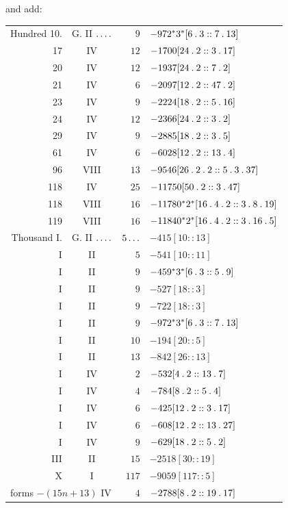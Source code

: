 \par{}and add:
\begin{longtable}{rcrl}
Hundred 10. & G. II $\mathinner{.\,.\,.\,.}$ & $9$ & $-972{}^{*}3^{*}[6\mathbin{.}3::7\mathbin{.}13]$ \\
17 & IV & $12$ & $-1700[24\mathbin{.}2::3\mathbin{.}17]$ \\
20 & IV & $12$ & $-1937[24\mathbin{.}2::7\mathbin{.}2]$ \\
21 & IV & $6$ & $-2097[12\mathbin{.}2::47\mathbin{.}2]$ \\
23 & IV & $9$ & $-2224[18\mathbin{.}2::5\mathbin{.}16]$ \\
24 & IV & $12$ & $-2366[24\mathbin{.}2::3\mathbin{.}2]$ \\
29 & IV & $9$ & $-2885[18\mathbin{.}2::3\mathbin{.}5]$ \\
61 & IV & $6$ & $-6028[12\mathbin{.}2::13\mathbin{.}4]$ \\
96 & VIII & $13$ & $-9546[26\mathbin{.}2\mathbin{.}2::5\mathbin{.}3\mathbin{.}37]$ \\
118 & IV & $25$ & $-11750[50\mathbin{.}2::3\mathbin{.}47]$ \\
118 & VIII & $16$ & $-11780{}^{*}2^{*}[16\mathbin{.}4\mathbin{.}2::3\mathbin{.}8\mathbin{.}19]$ \\
119 & VIII & $16$ & $-11840{}^{*}2^{*}[16\mathbin{.}4\mathbin{.}2::3\mathbin{.}16\mathbin{.}5]$ \\
Thousand I. & G. II $\mathinner{.\,.\,.\,.}$ & $5\mathinner{.\,.\,.}$ & $-415[10::13]$ \\
I & II & $5$ & $-541[10::11]$ \\
I & II & $9$ & $-459{}^{*}3^{*}[6\mathbin{.}3::5\mathbin{.}9]$ \\
I & II & $9$ & $-527[18::3]$ \\
I & II & $9$ & $-722[18::3]$ \\
I & II & $9$ & $-972{}^{*}3^{*}[6\mathbin{.}3::7\mathbin{.}13]$ \\
I & II & $10$ & $-194[20::5]$ \\
I & II & $13$ & $-842[26::13]$ \\
I & IV & $2$ & $-532[4\mathbin{.}2::13\mathbin{.}7]$ \\
I & IV & $4$ & $-784[8\mathbin{.}2::5\mathbin{.}4]$ \\
I & IV & $6$ & $-425[12\mathbin{.}2::3\mathbin{.}17]$ \\
I & IV & $6$ & $-608[12\mathbin{.}2::13\mathbin{.}27]$ \\
I & IV & $9$ & $-629[18\mathbin{.}2::5\mathbin{.}2]$ \\
III & II & $15$ & $-2518[30::19]$ \\
X & I & $117$ & $-9059[117::5]$ \\
\multicolumn{2}{l}{forms $-(15n+13)$ IV} & $4$ & $-2788[8\mathbin{.}2::19\mathbin{.}17]$ \\
\end{longtable}
